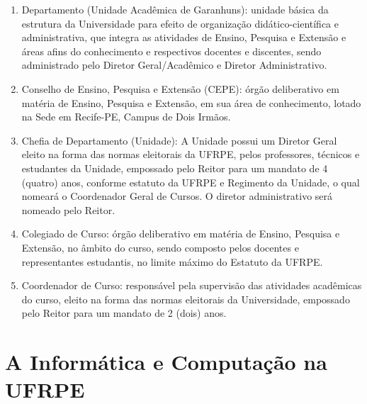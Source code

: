 \documentclass[
	12pt,				%
	openright,			%
  oneside,     %
	a4paper,			%
	english,			%
	french,				%
	spanish,			%
	brazil				%
	]{abntex2}
\begin{document}
\begin{enumerate}
\item Departamento (Unidade Acadêmica de Garanhuns): unidade básica da estrutura da Universidade para efeito de organização didático-científica e 
  administrativa, que integra as atividades de Ensino, Pesquisa e Extensão e
  áreas afins do conhecimento e respectivos docentes e discentes, sendo
  administrado pelo Diretor Geral/Acadêmico e Diretor Administrativo.
\item Conselho de Ensino, Pesquisa e Extensão (CEPE): órgão deliberativo em
matéria de Ensino, Pesquisa e Extensão, em sua área de conhecimento, lotado na
Sede em Recife-PE, Campus de Dois Irmãos.
\item Chefia de Departamento (Unidade): A
  Unidade possui um Diretor Geral eleito na forma das normas eleitorais da
  UFRPE, pelos professores, técnicos e estudantes da Unidade, empossado pelo
  Reitor para um mandato de 4 (quatro) anos, conforme estatuto da UFRPE e
  Regimento da Unidade, o qual nomeará o Coordenador Geral de Cursos. O diretor
  administrativo será nomeado pelo Reitor.
\item Colegiado de Curso: órgão deliberativo em matéria de Ensino, Pesquisa e
Extensão,  no âmbito do curso, sendo composto pelos docentes e representantes
estudantis, no limite máximo do Estatuto da UFRPE.
\item Coordenador de Curso: responsável pela supervisão das
  atividades acadêmicas do curso, eleito na forma das normas eleitorais da
  Universidade, empossado pelo Reitor para um mandato de 2 (dois) anos.
\end{enumerate}

\section*{A Informática e Computação na UFRPE}
\end{document}
